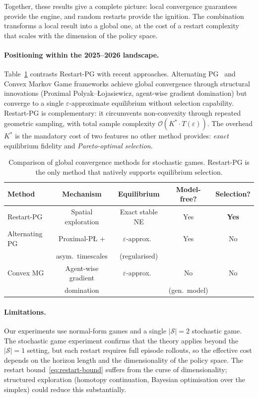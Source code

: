 \documentclass[a4paper,oneside,11pt]{report}
\newcommand{\calS}{\mathcal{S}}
\numberwithin{theorem}{chapter}
\numberwithin{equation}{chapter}
\begin{document}
Together, these results give a complete picture: local convergence
guarantees provide the engine, and random restarts provide the ignition.
The combination transforms a local result into a global one, at the cost
of a restart complexity that scales with the dimension of the policy
space.

\paragraph{Positioning within the 2025--2026 landscape.}
Table~\ref{tab:comparison} contrasts Restart-PG with recent
approaches. Alternating PG~\cite{kalogiannis2025} and Convex Markov
Game frameworks achieve global convergence through structural
innovations (Proximal Polyak--{\L}ojasiewicz, agent-wise gradient
domination) but converge to a single $\varepsilon$-approximate
equilibrium without selection capability. Restart-PG is complementary:
it circumvents non-convexity through repeated geometric sampling,
with total sample complexity
$\mathcal{O}(K^* \cdot T(\varepsilon))$. The overhead $K^*$ is the
mandatory cost of two features no other method provides: \emph{exact}
equilibrium fidelity and \emph{Pareto-optimal selection}.

\begin{table}[ht]
  \centering
  \small
  \caption{Comparison of global convergence methods for stochastic
    games. Restart-PG is the only method that natively supports
    equilibrium selection.}
  \label{tab:comparison}
  \begin{tabular}{lcccc}
    \toprule
    \textbf{Method} & \textbf{Mechanism} &
    \textbf{Equilibrium} & \textbf{Model-free?} &
    \textbf{Selection?} \\
    \midrule
    Restart-PG & Spatial exploration &
      Exact stable NE & Yes & \textbf{Yes} \\
    Alternating PG & Proximal-P{\L} + &
      $\varepsilon$-approx.\ & Yes & No \\
    & asym.\ timescales & (regularised) & & \\
    Convex MG & Agent-wise gradient &
      $\varepsilon$-approx.\ & No & No \\
    & domination & & (gen.\ model) & \\
    \bottomrule
  \end{tabular}
\end{table}

\paragraph{Limitations.}
Our experiments use normal-form games and a single $|\calS| = 2$
stochastic game. The stochastic game experiment confirms that the
theory applies beyond the $|\calS| = 1$ setting, but each restart
requires full episode rollouts, so the effective cost depends on the
horizon length and the dimensionality of the policy space.
The restart bound~\eqref{eq:restart-bound} suffers from the curse of
dimensionality; structured exploration
(homotopy continuation, Bayesian optimisation over the simplex) could
reduce this substantially.
\end{document}
